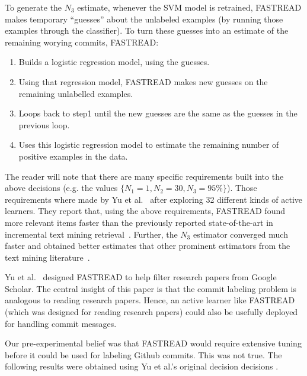 \documentclass[10pt,journal,compsoc]{IEEEtran}
\newcommand{\be}{\begin{enumerate}[leftmargin=0.4cm]}
\newcommand{\ee}{\end{enumerate}}
\begin{document}


 
To generate the $N_3$ estimate,
whenever the SVM  model  is retrained, FASTREAD makes temporary ``guesses''  about 
 the unlabeled examples (by running those examples through the classifier).
 To turn these guesses into an estimate of the remaining worying commits, FASTREAD:
 \be
 \item 
 Builds  a  logistic  regression  model, using the guesses.
 \item
 Using  that regression model, FASTREAD makes new guesses on the remaining unlabelled examples.
 \item
 Loops back to step1 until the new guesses are the same as the guesses
 in the previous loop.
 \item
 Uses this logistic regression model to estimate
 the remaining number of positive examples in the data. 
 \ee
The reader will note that there are many specific  requirements built into the above
decisions (e.g. the values   $\{N_1=1, N_2=30, N_3=95\%\}$). Those requirements where made by 
 Yu et al.~\cite{yu18v} after exploring 32 different kinds of  active learners.
 They report that, using the above requirements,
 FASTREAD
 found  more relevant items faster than the
previously reported state-of-the-art in incremental text mining
retrieval~\cite{wallace2010active, Cormack2015Autonomy}. Further,
the $N_3$ estimator converged much faster and obtained better estimates
that  other prominent  estimators from the text mining literature~\cite{ros2017machine,Cormack2016Engineering,wallace2013active}.


 
 Yu et al.~\cite{yu18v} designed FASTREAD to help filter research papers from Google Scholar.
The central insight of this paper is that the commit labeling problem  is  analogous  to  reading  research  papers.  Hence, an  active  learner  like  FASTREAD
(which  was  designed  for reading research papers) could also be usefully deployed for handling commit messages. 

Our pre-experimental belief was that FASTREAD
would require extensive tuning before it could be  used for labeling
    Github commits. This was not true.  The following results were obtained
using Yu et al.'s original decision decisions \cite{yu18v}. 


\end{document}
